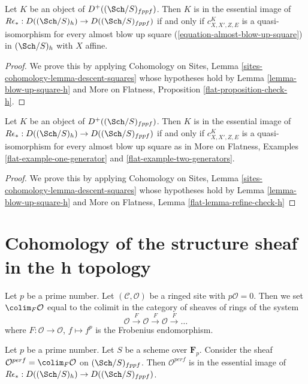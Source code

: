 \begin{proposition}
\label{proposition-check-h}
Let $K$ be an object of $D^+((\Sch/S)_{fppf})$.
Then $K$ is in the essential image of
$R\epsilon_* : D((\Sch/S)_h) \to D((\Sch/S)_{fppf})$
if and only if $c^K_{X, X', Z, E}$ is a quasi-isomorphism
for every almost blow up square (\ref{equation-almost-blow-up-square})
in $(\Sch/S)_h$ with $X$ affine.
\end{proposition}

\begin{proof}
We prove this by applying
Cohomology on Sites, Lemma \ref{sites-cohomology-lemma-descent-squares}
whose hypotheses hold by
Lemma \ref{lemma-blow-up-square-h} and
More on Flatness, Proposition \ref{flat-proposition-check-h}.
\end{proof}

\begin{lemma}
\label{lemma-refine-check-h}
Let $K$ be an object of $D^+((\Sch/S)_{fppf})$. Then $K$ is in the
essential image of $R\epsilon_* : D((\Sch/S)_h) \to D((\Sch/S)_{fppf})$
if and only if $c^K_{X, X', Z, E}$ is a quasi-isomorphism
for every almost blow up square as in
More on Flatness, Examples \ref{flat-example-one-generator} and
\ref{flat-example-two-generators}.
\end{lemma}

\begin{proof}
We prove this by applying
Cohomology on Sites, Lemma \ref{sites-cohomology-lemma-descent-squares}
whose hypotheses hold by
Lemma \ref{lemma-blow-up-square-h} and
More on Flatness, Lemma \ref{flat-lemma-refine-check-h}
\end{proof}






\section{Cohomology of the structure sheaf in the h topology}
\label{section-cohomology-O-h}

\noindent
Let $p$ be a prime number. Let $(\mathcal{C}, \mathcal{O})$ be a ringed site
with $p\mathcal{O} = 0$. Then we set $\colim_F \mathcal{O}$
equal to the colimit in the category of sheaves of rings of the system
$$
\mathcal{O} \xrightarrow{F} \mathcal{O} \xrightarrow{F}
\mathcal{O} \xrightarrow{F} \ldots
$$
where $F : \mathcal{O} \to \mathcal{O}$, $f \mapsto f^p$
is the Frobenius endomorphism.

\begin{lemma}
\label{lemma-h-sheaf-colim-F}
Let $p$ be a prime number. Let $S$ be a scheme over $\mathbf{F}_p$.
Consider the sheaf $\mathcal{O}^{perf} = \colim_F \mathcal{O}$
on $(\Sch/S)_{fppf}$. Then $\mathcal{O}^{perf}$ is in the essential
image of $R\epsilon_* : D((\Sch/S)_h) \to D((\Sch/S)_{fppf})$.
\end{lemma}

